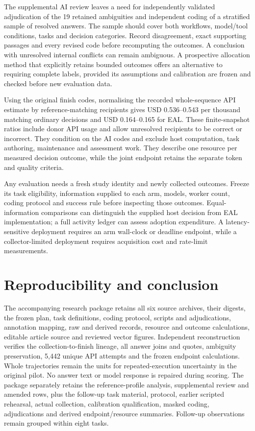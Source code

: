 \documentclass[preprint,11pt]{elsarticle}
\begin{document}
The supplemental AI review leaves a need for independently validated
adjudication of the 19 retained ambiguities and independent coding of a
stratified sample of resolved answers. The sample should cover both
workflows, model/tool conditions, tasks and decision categories. Record
disagreement, exact supporting passages and every revised code before
recomputing the outcomes. A conclusion with unresolved internal
conflicts can remain ambiguous. A prospective allocation method that
explicitly retains bounded outcomes offers an alternative to requiring
complete labels, provided its assumptions and calibration are frozen and
checked before new evaluation data.

Using the original finish codes, normalising the recorded whole-sequence
API estimate by reference-matching recipients gives USD 0.536--0.543 per
thousand matching ordinary decisions and USD 0.164--0.165 for EAL. These
finite-snapshot ratios include donor API usage and allow unresolved
recipients to be correct or incorrect. They condition on the AI codes
and exclude host computation, task authoring, maintenance and assessment
work. They describe one resource per measured decision outcome, while
the joint endpoint retains the separate token and quality criteria.

Any evaluation needs a fresh study identity and newly collected
outcomes. Freeze its task eligibility, information supplied to each arm,
models, worker count, coding protocol and success rule before inspecting
those outcomes. Equal-information comparisons can distinguish the
supplied host decision from EAL implementation; a full activity ledger
can assess adoption expenditure. A latency-sensitive deployment requires
an arm wall-clock or deadline endpoint, while a collector-limited
deployment requires acquisition cost and rate-limit measurements.

\FloatBarrier

\hypertarget{reproducibility-and-conclusion}{%
\section{Reproducibility and
conclusion}\label{reproducibility-and-conclusion}}

The accompanying research package retains all six source archives, their digests,
the frozen plan, task definitions, coding protocol, scripts and
adjudications, annotation mapping, raw and derived records, resource and
outcome calculations, editable article source and reviewed vector
figures. Independent reconstruction verifies the collection-to-finish
lineage, all answer joins and quotes, ambiguity preservation, 5,442
unique API attempts and the frozen endpoint calculations. Whole
trajectories remain the units for repeated-execution uncertainty in the
original pilot. No answer text or model response is repaired during
scoring. The package separately retains the reference-profile analysis,
supplemental review and amended rows, plus the follow-up task material,
protocol, earlier scripted rehearsal, actual collection, calibration
qualification, masked coding, adjudications and derived
endpoint/resource summaries. Follow-up observations remain grouped
within eight tasks.
\end{document}
